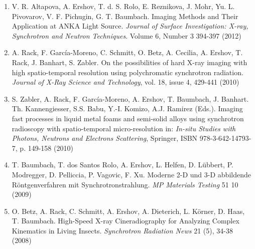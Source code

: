 \documentclass[a4paper,12pt, twoside]{book}
\begin{document}
\begin{enumerate}
\item V. R. Altapova, A. Ershov, T. d. S. Rolo, E. Reznikova, J. Mohr, Yu. L. Pivovarov, V. F. Pichugin, G. T. Baumbach. Imaging Methods and Their Application at ANKA Light Source.
\textit{Journal of Surface Investigation: X-ray, Synchrotron and Neutron Techniques}. Volume 6, Number 3 394-397 (2012)

\item A. Rack, F. Garc\'ia-Moreno, C. Schmitt, O. Betz, A. Cecilia, A. Ershov, T. Rack, J. Banhart, S. Zabler.
On the possibilities of hard X-ray imaging with high spatio-temporal resolution using polychromatic synchrotron radiation. \textit{Journal of X-Ray Science and Technology}, vol. 18, issue 4, 429-441 (2010)

\item S. Zabler, A. Rack, F. Garc\'ia-Moreno, A. Ershov, T. Baumbach, J. Banhart.
Th. Kannengiesser, S.S. Babu, Y.-I. Komizo, A.J. Ramirez (Eds.).
Imaging fast processes in liquid metal foams and semi-solid alloys using synchrotron radioscopy with spatio-temporal micro-resolution in: \textit{In-situ Studies with Photons, Neutrons and Electrons Scattering}, Springer, ISBN 978-3-642-14793-7, p. 149-158 (2010)

\item T. Baumbach, T. dos Santos Rolo, A. Ershov, L. Helfen, D. L\"ubbert, P. Modregger, D. Pelliccia, P. Vagovic, F. Xu.
Moderne 2-D und 3-D abbildende Röntgenverfahren mit Synchrotronstrahlung.
\textit{MP Materials Testing} 51 10 (2009)

\item O. Betz, A. Rack, C. Schmitt, A. Ershov, A. Dieterich, L. K\"orner, D. Haas, T. Baumbach.
High-Speed X-ray Cineradiography for Analyzing Complex Kinematics in Living Insects.
\textit{Synchrotron Radiation News} 21 (5), 34-38 (2008)

\end{enumerate}


\end{document}
